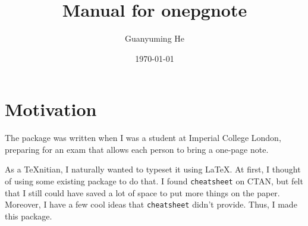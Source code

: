 \documentclass{article}
\author{Guanyuming He}
\date{\today}
\title{Manual for onepgnote}
\begin{document}
\pagestyle{empty}
\maketitle
\tableofcontents

\clearpage
\section{Motivation}
The package was written when I was a student at Imperial College London,
preparing for an exam that allows each person to bring a one-page note.

As a \TeX nitian, I naturally wanted to typeset it using \LaTeX. At first, I
thought of using some existing package to do that. I found \texttt{cheatsheet}
on CTAN, but felt that I still could have saved a lot of space to put more
things on the paper. Moreover, I have a few cool ideas that \texttt{cheatsheet}
didn't provide. Thus, I made this package.
\end{document}
